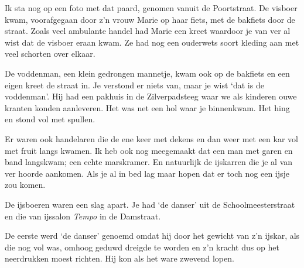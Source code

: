 \documentclass[10pt,twoside, openright]{memoir}
\begin{document}
Ik sta nog op een foto met dat paard, genomen vanuit de Poortstraat. De visboer kwam, voorafgegaan door z’n vrouw Marie op haar fiets, met de bakfiets door de straat. Zoals veel ambulante handel had Marie een kreet waardoor je van ver al wist dat de visboer eraan kwam. Ze had nog een ouderwets soort kleding aan met veel schorten over elkaar.

De voddenman, een klein gedrongen mannetje, kwam ook op de bakfiets en een eigen kreet de straat in. Je verstond er niets van, maar je wist `dat is de voddenman’. Hij had een pakhuis in de Zilverpadsteeg waar we als kinderen ouwe kranten konden aanleveren. Het was net een hol waar je binnenkwam. Het hing en stond vol met spullen. 

Er waren ook handelaren die de ene keer met dekens en dan weer met een kar vol met fruit langs kwamen. Ik heb ook nog meegemaakt dat een man met garen en band langskwam; een echte marskramer. En natuurlijk de ijskarren die je al van ver hoorde aankomen. Als je al in bed lag maar hopen dat er toch nog een ijsje zou komen.

De ijsboeren waren een slag apart. Je had `de danser’ uit de Schoolmeesterstraat en die van ijssalon \emph{Tempo} in de Damstraat. 

De eerste werd `de danser' genoemd omdat hij door het gewicht van z’n ijskar, als die nog vol was, omhoog geduwd dreigde te worden en z’n kracht dus op het neerdrukken moest richten. Hij kon als het ware zwevend lopen. 
\end{document}
